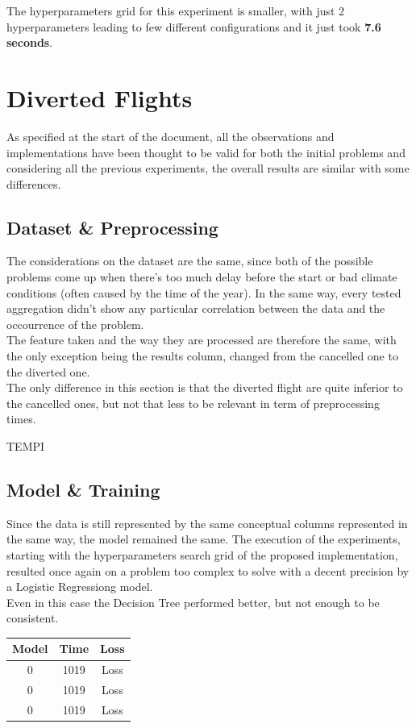 \documentclass[
	letterpaper, %
	10pt, %
]{class}
\begin{document}
The hyperparameters grid for this experiment is smaller, with just 2 hyperparameters leading to few different configurations and it just took \textbf{7.6 seconds}.

\section{Diverted Flights}

As specified at the start of the document, all the observations and implementations have been thought to be valid for both the initial problems and considering all the previous experiments, the overall results are similar with some differences.\\

\subsection{Dataset \& Preprocessing}
The considerations on the dataset are the same, since both of the possible problems come up when there's too much delay before the start or bad climate conditions (often caused by the time of the year). In the same way, every tested aggregation didn't show any particular correlation between the data and the occourrence of the problem.\\
The feature taken and the way they are processed are therefore the same, with the only exception being the results column, changed from the cancelled one to the diverted one.\\

The only difference in this section is that the diverted flight are quite inferior to the cancelled ones, but not that less to be relevant in term of preprocessing times.

TEMPI

\subsection{Model \& Training}
Since the data is still represented by the same conceptual columns represented in the same way, the model remained the same.
The execution of the experiments, starting with the hyperparameters search grid of the proposed implementation, resulted once again on a problem too complex to solve with a decent precision by a Logistic Regressiong model.\\
Even in this case the Decision Tree performed better, but not enough to be consistent.


\begin{center}
    \begin{tabular}{ |c|c|c| }
        \hline
        Model & Time & Loss \\
        \hline
        0     & 1019 & Loss \\
        \hline
        0     & 1019 & Loss \\
        \hline
        0     & 1019 & Loss \\
        \hline
    \end{tabular}
\end{center}
\end{document}

